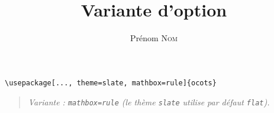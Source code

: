 \documentclass[11pt]{ocots-book}
\title{Variante d'option}
\author{Prénom \textsc{Nom}}
\newcommand{\ocotsvariantnote}[1]{\begin{quote}\itshape Variante : #1\end{quote}}
\begin{document}
\maketitle

\begin{lstlisting}
\usepackage[..., theme=slate, mathbox=rule]{ocots}
\end{lstlisting}
\ocotsvariantnote{\texttt{mathbox=rule} (le th\`eme \texttt{slate} utilise par d\'efaut \texttt{flat}).}

\end{document}
